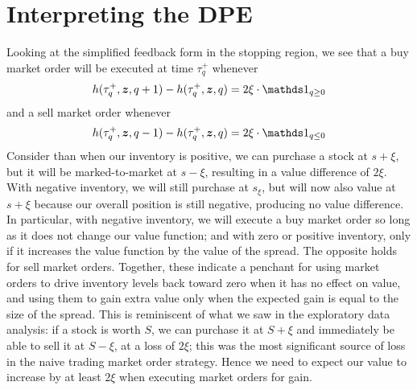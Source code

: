 \section{Interpreting the DPE}

Looking at the simplified feedback form in the stopping region, we see that a buy market order will be executed at time $\tau^+_q$ whenever
\begin{equation}\label{eq:buyMOfeedbackcase1}
h(\tau^+_q, \bz, q+1) - h(\tau^+_q,\bz,q) = 2 \xi \cdot \indicator_{q \geq 0}
\end{equation}
and a sell market order whenever
\begin{equation}\label{eq:sellMOfeedbackcase1}
h(\tau^+_q, \bz, q-1) - h(\tau^+_q,\bz,q) = 2 \xi \cdot \indicator_{q \leq 0}
\end{equation}
Consider than when our inventory is positive, we can purchase a stock at $s+\xi$, but it will be marked-to-market at $s-\xi$, resulting in a value difference of $2\xi$. With negative inventory, we will still purchase at $s_\xi$, but will now also value at $s+\xi$ because our overall position is still negative, producing no value difference. In particular, with negative inventory, we will execute a buy market order so long as it does not change our value function; and with zero or positive inventory, only if it increases the value function by the value of the spread. The opposite holds for sell market orders. Together, these indicate a penchant for using market orders to drive inventory levels back toward zero when it has no effect on value, and using them to gain extra value only when the expected gain is equal to the size of the spread. This is reminiscent of what we saw in the exploratory data analysis: if a stock is worth $S$, we can purchase it at $S+\xi$ and immediately be able to sell it at $S-\xi$, at a loss of $2 \xi$; this was the most significant source of loss in the naive trading market order strategy. Hence we need to expect our value to increase by at least $2\xi$ when executing market orders for gain.

